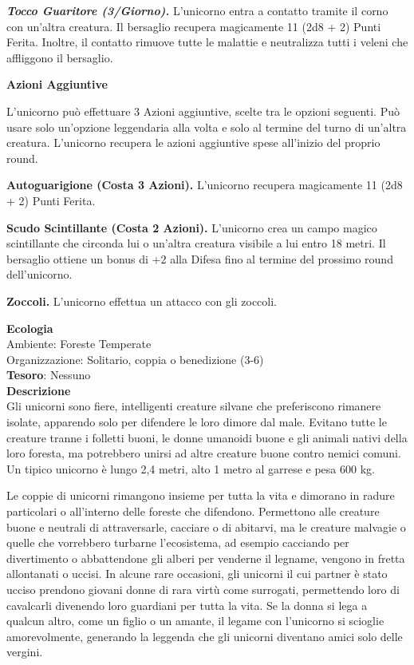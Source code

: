 \begin{multicols}{2}
\textit{\textbf{Tocco Guaritore (3/Giorno).}} L'unicorno entra a contatto tramite il corno con un'altra creatura. Il bersaglio recupera magicamente 11 (2d8 + 2) Punti Ferita. Inoltre, il contatto rimuove tutte le malattie e neutralizza tutti i veleni che affliggono il bersaglio.

\textbf{Azioni Aggiuntive}

L'unicorno può effettuare 3 Azioni aggiuntive, scelte tra le opzioni seguenti. Può usare solo un'opzione leggendaria alla volta e solo al termine del turno di un'altra creatura. L'unicorno recupera le azioni aggiuntive spese all'inizio del proprio round.

\textbf{Autoguarigione (Costa 3 Azioni).} L'unicorno recupera magicamente 11 (2d8 + 2) Punti Ferita.

\textbf{Scudo Scintillante (Costa 2 Azioni).} L'unicorno crea un campo magico scintillante che circonda lui o un'altra creatura visibile a lui entro 18 metri. Il bersaglio ottiene un bonus di +2 alla Difesa fino al termine del prossimo round dell'unicorno.

\textbf{Zoccoli.} L'unicorno effettua un attacco con gli zoccoli.

\textbf{Ecologia}\\
Ambiente: Foreste Temperate\\
Organizzazione: Solitario, coppia o benedizione (3-6)\\
\textbf{Tesoro}: Nessuno\\
\textbf{Descrizione}\\
Gli unicorni sono fiere, intelligenti creature silvane che preferiscono rimanere isolate, apparendo solo per difendere le loro dimore dal male. Evitano tutte le creature tranne i folletti buoni, le donne umanoidi buone e gli animali nativi della loro foresta, ma potrebbero unirsi ad altre creature buone contro nemici comuni. Un tipico unicorno è lungo 2,4 metri, alto 1 metro al garrese e pesa 600 kg.

Le coppie di unicorni rimangono insieme per tutta la vita e dimorano in radure particolari o all'interno delle foreste che difendono. Permettono alle creature buone e neutrali di attraversarle, cacciare o di abitarvi, ma le creature malvagie o quelle che vorrebbero turbarne l'ecosistema, ad esempio cacciando per divertimento o abbattendone gli alberi per venderne il legname, vengono in fretta allontanati o uccisi. In alcune rare occasioni, gli unicorni il cui partner è stato ucciso prendono giovani donne di rara virtù come surrogati, permettendo loro di cavalcarli divenendo loro guardiani per tutta la vita. Se la donna si lega a qualcun altro, come un figlio o un amante, il legame con l'unicorno si scioglie amorevolmente, generando la leggenda che gli unicorni diventano amici solo delle vergini.


\end{multicols}
